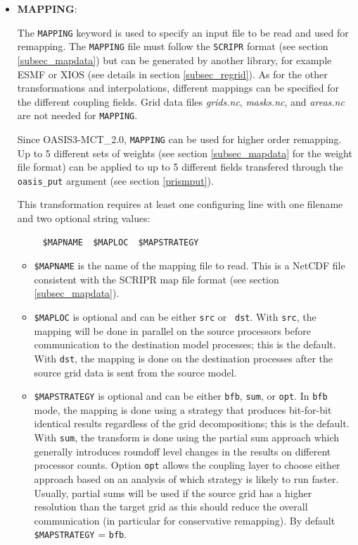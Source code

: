 \begin{itemize}

\item {\bf MAPPING}:

  The {\tt MAPPING} keyword is used to specify an input file to be
  read and used for remapping. The
  {\tt MAPPING} file must follow the {\tt SCRIPR} format (see
    section \ref{subsec_mapdata}) but can be generated by another
    library, for example ESMF or XIOS (see details in section \ref{subsec_regrid}). As for the other transformations
    and interpolations, different mappings can be specified for the
    different coupling fields. Grid data files {\it grids.nc}, {\it masks.nc}, and {\it areas.nc}
  are not needed for {\tt MAPPING}. 
 
  Since OASIS3-MCT\_2.0, {\tt MAPPING} can be used for higher order
  remapping. Up to 5 different sets of weights (see section
  \ref{subsec_mapdata} for the weight file format) can be applied to
  up to 5 different fields transfered through the {\tt oasis\_put} argument
  (see section \ref{prismput}).

  This transformation requires at least one configuring line with one
  filename and two optional string values:
\begin{verbatim}
     $MAPNAME  $MAPLOC  $MAPSTRATEGY
\end{verbatim}
  \begin{itemize}
  \item {\tt \$MAPNAME} is the name of the mapping file to read.  This
    is a NetCDF file consistent with the SCRIPR map file format (see
    section \ref{subsec_mapdata}).

  \item {\tt \$MAPLOC} is optional and can be either {\tt src} or {\tt
      dst}.  With {\tt src}, the mapping will be done in parallel on
    the source processors before communication to the destination
    model processes; this is the default.  With {\tt dst}, the mapping
    is done on the destination processes after the source grid data is
    sent from the source model.

  \item {\tt \$MAPSTRATEGY} is optional and can be either {\tt bfb},
    {\tt sum}, or {\tt opt}.  In {\tt bfb} mode, the mapping is done
    using a strategy that produces bit-for-bit identical results
    regardless of the grid decompositions; this is the default.  With {\tt sum}, the
    transform is done using the partial sum approach which generally
    introduces roundoff level changes in the results on different
    processor counts. Option {\tt opt} allows the coupling layer to
    choose either approach based on an analysis of which strategy is
    likely to run faster. Usually, partial sums will be used if the
    source grid has a higher resolution than the target grid as this
    should reduce the overall communication (in particular for conservative
    remapping). By default {\tt \$MAPSTRATEGY} = {\tt bfb}.


\end{itemize}
\end{itemize}
